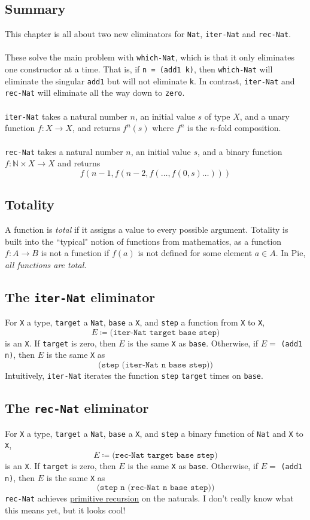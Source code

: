 \documentclass{article}
\newcommand{\ttt}[1]{\texttt{#1}}
\begin{document}
\subsection{Summary}
This chapter is all about two new eliminators for \ttt{Nat}, \ttt{iter-Nat} and \ttt{rec-Nat}.
\\ \\
These solve the main problem with \ttt{which-Nat}, which is that it only eliminates one constructor at a time. That is, if \ttt{n = (add1 k)}, then \ttt{which-Nat} will eliminate the singular \ttt{add1} but will not eliminate \ttt{k}. In contrast, \ttt{iter-Nat} and \ttt{rec-Nat} will eliminate all the way down to \ttt{zero}.
\\ \\
\ttt{iter-Nat} takes a natural number \(n\), an initial value \(s\) of type \(X\), and a unary function \(f : X \to X\), and returns \(f^n(s)\) where \(f^n\) is the \(n\)-fold composition.
\\ \\
\ttt{rec-Nat} takes a natural number \(n\), an initial value \(s\), and a binary function \(f : \mathbb{N} \times X \to X\) and returns \[
    f(n - 1, f(n-2, f(\dots, f(0, s)\dots)))
\]
\subsection{Totality}
A function is \textit{total} if it assigns a value to every possible argument. Totality is built into the ``typical" notion of functions from mathematics, as a function \(f : A \to B\) is not a function if \(f(a)\) is not defined for some element \(a \in A\). In Pie, \textit{all functions are total.}
\subsection{The \ttt{iter-Nat} eliminator}
For \ttt{X} a type, \ttt{target} a \ttt{Nat}, \ttt{base} a \ttt{X}, and \ttt{step} a function from \ttt{X} to \ttt{X}, \[ E \coloneqq \ttt{(iter-Nat target base step)} \] is an \ttt{X}. If \ttt{target} is zero, then \(E\) is the same \ttt{X} as \ttt{base}. Otherwise, if \(E = \) \ttt{(add1 n)}, then \(E\) is the same \ttt{X} as \[
    \ttt{(step (iter-Nat n base step))}
\]
Intuitively, \ttt{iter-Nat} iterates the function \ttt{step} \ttt{target} times on \ttt{base}.
\subsection{The \ttt{rec-Nat} eliminator} \label{rec-nat-elim}
For \ttt{X} a type, \ttt{target} a \ttt{Nat}, \ttt{base} a \ttt{X}, and \ttt{step} a binary function of \ttt{Nat} and \ttt{X} to \ttt{X}, \[ E \coloneqq \ttt{(rec-Nat target base step)} \] is an \ttt{X}. If \ttt{target} is zero, then \(E\) is the same \ttt{X} as \ttt{base}. Otherwise, if \(E = \) \ttt{(add1 n)}, then \(E\) is the same \ttt{X} as \[
    \ttt{(step n (rec-Nat n base step))}
\]
\ttt{rec-Nat} achieves \href{https://en.wikipedia.org/wiki/Primitive_recursive_function}{primitive recursion} on the naturals. I don't really know what this means yet, but it looks cool!
\end{document}
